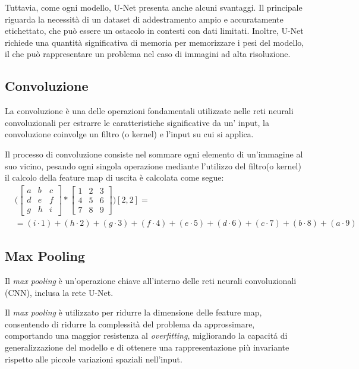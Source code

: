 Tuttavia, come ogni modello, U-Net presenta anche alcuni svantaggi. Il principale riguarda la
necessità di un dataset di addestramento ampio e accuratamente etichettato, che può essere un
ostacolo in contesti con dati limitati. Inoltre, U-Net richiede una quantità significativa di
memoria per memorizzare i pesi del modello, il che può rappresentare un problema nel caso di
immagini ad alta risoluzione.


\subsection{Convoluzione}
\label{sec:convoluzione}

La convoluzione è una delle operazioni fondamentali utilizzate nelle reti
neurali convoluzionali per estrarre le caratteristiche significative da un'
input, la convoluzione coinvolge un filtro (o kernel) e l'input su cui si
applica.

Il processo di convoluzione consiste nel sommare ogni elemento di un'immagine
al suo vicino, pesando ogni singola operazione mediante l'utilizzo del filtro(o
kernel) il calcolo della feature map di uscita è calcolata come segue:
\begin{align}
	 & \Bigg( \begin{bmatrix}
		          a & b & c \\
		          d & e & f \\
		          g & h & i
	          \end{bmatrix}
	*
	\begin{bmatrix}
		1 & 2 & 3 \\
		4 & 5 & 6 \\
		7 & 8 & 9
	\end{bmatrix}
	\Bigg) [2, 2] =                                                                                                                  \\
	 & = (i \cdot 1) + (h \cdot 2) + (g \cdot 3) + (f \cdot 4) + (e \cdot 5) + (d \cdot 6) + (c \cdot 7) + (b \cdot 8) + (a \cdot 9)
\end{align}


\subsection{Max Pooling}
\label{sec:max_pooling}

Il \textit{max pooling} è un'operazione chiave all'interno delle reti neurali convoluzionali (CNN),
inclusa la rete U-Net.

Il \textit{max pooling} è utilizzato per ridurre la dimensione delle feature
map, consentendo di ridurre la complessità del problema da approssimare,
comportando una maggior resistenza al \textit{overfitting}, migliorando la
capacit\'a di generalizzazione del modello e di ottenere una rappresentazione
più invariante rispetto alle piccole variazioni spaziali nell'input.


